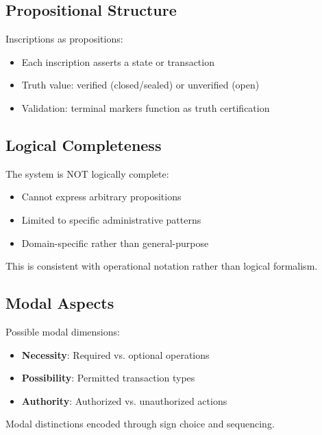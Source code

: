 \subsection{Propositional Structure}

Inscriptions as propositions:
\begin{itemize}
    \item Each inscription asserts a state or transaction
    \item Truth value: verified (closed/sealed) or unverified (open)
    \item Validation: terminal markers function as truth certification
\end{itemize}

\subsection{Logical Completeness}

The system is NOT logically complete:
\begin{itemize}
    \item Cannot express arbitrary propositions
    \item Limited to specific administrative patterns
    \item Domain-specific rather than general-purpose
\end{itemize}

This is consistent with operational notation rather than logical formalism.

\subsection{Modal Aspects}

Possible modal dimensions:
\begin{itemize}
    \item \textbf{Necessity}: Required vs. optional operations
    \item \textbf{Possibility}: Permitted transaction types
    \item \textbf{Authority}: Authorized vs. unauthorized actions
\end{itemize}

Modal distinctions encoded through sign choice and sequencing.
